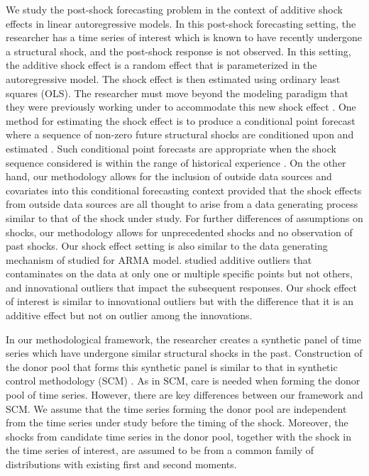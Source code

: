 \documentclass[11pt,3p,review,authoryear]{elsarticle}
\theoremstyle{definition}
\begin{document}
We study the post-shock forecasting problem in the context of additive shock effects in linear autoregressive models. In this post-shock forecasting setting, the researcher has a time series of interest which is known to have recently undergone a structural shock, and the post-shock response is not observed. In this setting, the additive shock effect is a random effect that is parameterized in the autoregressive model. The shock effect is then estimated using ordinary least squares (OLS). The researcher must move beyond the modeling paradigm that they were previously working under to accommodate this new shock effect \citep{monti2008forecast, svensson2005monetary}. One method for estimating the shock effect is to produce a conditional point forecast where a sequence of non-zero future structural shocks are conditioned upon and estimated \citep{baumeister2014real}. Such conditional point forecasts are appropriate when the shock sequence considered is within the range of historical experience \citep{kilian2017structural}. On the other hand, our methodology allows for the inclusion of outside data sources and covariates into this conditional forecasting context provided that the shock effects from outside data sources are all thought to arise from a  data generating process similar to that of the shock under study. For further differences of assumptions on shocks, our methodology allows for unprecedented shocks and no observation of past shocks. Our shock effect setting is also similar to the data generating mechanism of  \cite{tsay1986time} studied for ARMA model. \cite{tsay1986time} studied additive outliers that contaminates on the data at only one or multiple specific points but not others, and innovational outliers that impact the subsequent responses. Our shock effect of interest is similar to innovational  outliers  but with the difference that it is an additive effect but not on outlier among the innovations.

In our methodological framework, the researcher creates a synthetic panel of time series which have undergone similar structural shocks in the past. Construction of the donor pool that forms this synthetic panel is similar to that in synthetic control methodology (SCM) \citep{abadie2010synthetic}. As in SCM, care is needed when forming the donor pool of time series. However, there are key differences between our framework and SCM. We assume that the time series forming the donor pool are independent from the time series under study before the timing of the shock. Moreover, the shocks from candidate time series in the donor pool, together with the shock in the time series of interest, are assumed to be  from a common family of distributions with existing first and second moments. 
\end{document}
